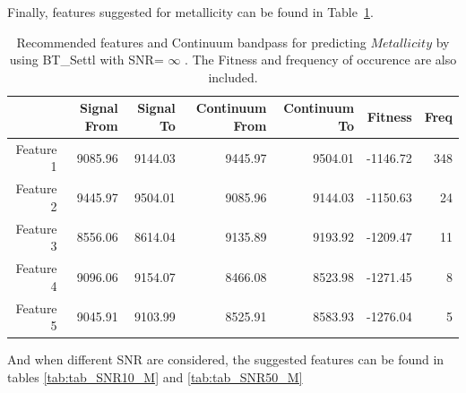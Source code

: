 {{Finally, features suggested for metallicity 
can be found in Table~\ref{tab:tab_SNRoo_M}.

\begin{table}
\begin{center}
\begin{tabular}{rrrrrrr}
  \hline
 & Signal From & Signal To & Continuum From & Continuum To & Fitness & Freq \\ 
  \hline
Feature 1 & 9085.96 & 9144.03 & 9445.97 & 9504.01  & -1146.72 & 348 \\ 
  Feature 2 & 9445.97 & 9504.01 & 9085.96 & 9144.03 & -1150.63 &  24 \\ 
  Feature 3 & 8556.06 & 8614.04 & 9135.89 & 9193.92 & -1209.47 &  11 \\ 
  Feature 4 & 9096.06 & 9154.07 & 8466.08 & 8523.98 & -1271.45 &   8 \\ 
  Feature 5 & 9045.91 & 9103.99 & 8525.91 & 8583.93 & -1276.04 &   5 \\  
   \hline
\end{tabular}
\caption {Recommended features and Continuum bandpass for predicting $Metallicity$ 
     by using BT\_Settl with SNR= $ \infty $ . 
      The Fitness and frequency of occurence are also included.} \label{tab:tab_SNRoo_M} 
\end{center}
\end{table}

And when different SNR are considered, the suggested features can be found in 
tables \ref{tab:tab_SNR10_M} and \ref{tab:tab_SNR50_M}

}}
